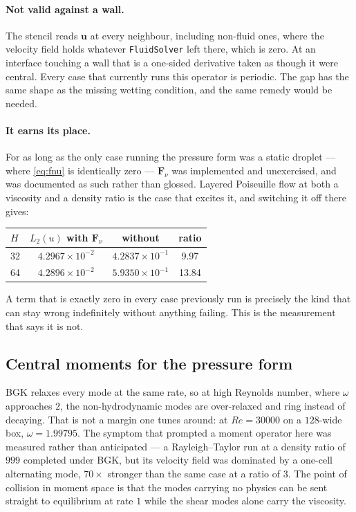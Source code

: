 \documentclass[11pt,a4paper]{article}
\newcommand{\code}[1]{\texttt{\small #1}}
\newcommand{\uu}{\bm{u}}
\newcommand{\e}[1]{\times 10^{#1}}
\begin{document}
\paragraph{Not valid against a wall.} The stencil reads $\uu$ at every neighbour,
including non-fluid ones, where the velocity field holds whatever
\code{FluidSolver} left there, which is zero. At an interface touching a wall
that is a one-sided derivative taken as though it were central. Every case that
currently runs this operator is periodic. The gap has the same shape as the
missing wetting condition, and the same remedy would be needed.

\paragraph{It earns its place.} For as long as the only case running the pressure
form was a static droplet --- where \eqref{eq:fnu} is identically zero ---
$\bm{F}_\nu$ was implemented and unexercised, and was documented as such rather
than glossed. Layered Poiseuille flow at both a viscosity and a density ratio is
the case that excites it, and switching it off there gives:

\begin{center}\small
\begin{tabular}{lccc}
\toprule
$H$ & $L_2(u)$ with $\bm{F}_\nu$ & without & ratio \\
\midrule
32 & $4.2967\e{-2}$ & $4.2837\e{-1}$ & 9.97 \\
64 & $4.2896\e{-2}$ & $5.9350\e{-1}$ & 13.84 \\
\bottomrule
\end{tabular}
\end{center}

\noindent A term that is exactly zero in every case previously run is precisely
the kind that can stay wrong indefinitely without anything failing. This is the
measurement that says it is not.

\subsection{Central moments for the pressure form}\label{sec:mpcm}

BGK relaxes every mode at the same rate, so at high Reynolds number, where
$\omega$ approaches $2$, the non-hydrodynamic modes are over-relaxed and ring
instead of decaying. That is not a margin one tunes around: at $Re=30000$ on a
$128$-wide box, $\omega=1.99795$. The symptom that prompted a moment operator here
was measured rather than anticipated --- a Rayleigh--Taylor run at a density ratio
of $999$ completed under BGK, but its velocity field was dominated by a one-cell
alternating mode, $70\times$ stronger than the same case at a ratio of $3$. The
point of collision in moment space is that the modes carrying no physics can be
sent straight to equilibrium at rate $1$ while the shear modes alone carry the
viscosity.
\end{document}
